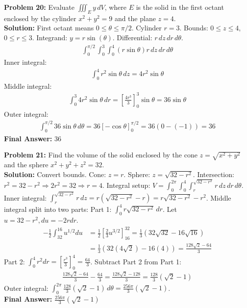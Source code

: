 \documentclass[12pt]{article}
\begin{document}
\textbf{Problem 20:} Evaluate $\iiint_E y \, dV$, where $E$ is the solid in the first octant enclosed by the cylinder $x^2+y^2=9$ and the plane $z=4$.
\\
\textbf{Solution:} First octant means $0 \le \theta \le \pi/2$. Cylinder $r=3$. Bounds: $0 \le z \le 4$, $0 \le r \le 3$. Integrand: $y = r\sin(\theta)$. Differential: $r \, dz \, dr \, d\theta$.
\begin{align*}
\int_0^{\pi/2} \int_0^3 \int_0^4 (r\sin\theta) r \, dz \, dr \, d\theta
\end{align*}
Inner integral:
\begin{align*}
\int_0^4 r^2\sin\theta \, dz = 4r^2\sin\theta
\end{align*}
Middle integral:
\begin{align*}
\int_0^3 4r^2\sin\theta \, dr = \left[ \frac{4r^3}{3} \right]_0^3 \sin\theta = 36\sin\theta
\end{align*}
Outer integral:
\begin{align*}
\int_0^{\pi/2} 36\sin\theta \, d\theta = 36[-\cos\theta]_0^{\pi/2} = 36(0 - (-1)) = 36
\end{align*}
\textbf{Final Answer:} $36$
\vspace{0.5cm}

\textbf{Problem 21:} Find the volume of the solid enclosed by the cone $z = \sqrt{x^2+y^2}$ and the sphere $x^2+y^2+z^2=32$.
\\
\textbf{Solution:} Convert bounds. Cone: $z=r$. Sphere: $z = \sqrt{32-r^2}$. Intersection: $r^2 = 32-r^2 \Rightarrow 2r^2=32 \Rightarrow r=4$.
Integral setup: $V = \int_0^{2\pi} \int_0^4 \int_r^{\sqrt{32-r^2}} r \, dz \, dr \, d\theta$.
Inner integral: $\int_r^{\sqrt{32-r^2}} r \, dz = r(\sqrt{32-r^2} - r) = r\sqrt{32-r^2} - r^2$.
Middle integral split into two parts:
Part 1: $\int_0^4 r\sqrt{32-r^2} \, dr$. Let $u=32-r^2, du=-2rdr$.
\begin{align*}
-\frac{1}{2} \int_{32}^{16} u^{1/2} du &= \frac{1}{2} \left[ \frac{2}{3}u^{3/2} \right]_{16}^{32} = \frac{1}{3}(32\sqrt{32} - 16\sqrt{16}) \\
&= \frac{1}{3}(32(4\sqrt{2}) - 16(4)) = \frac{128\sqrt{2} - 64}{3}
\end{align*}
Part 2: $\int_0^4 r^2 dr = \left[\frac{r^3}{3}\right]_0^4 = \frac{64}{3}$. Subtract Part 2 from Part 1:
\begin{align*}
\frac{128\sqrt{2} - 64}{3} - \frac{64}{3} = \frac{128\sqrt{2} - 128}{3} = \frac{128}{3}(\sqrt{2}-1)
\end{align*}
Outer integral: $\int_0^{2\pi} \frac{128}{3}(\sqrt{2}-1) \, d\theta = \frac{256\pi}{3}(\sqrt{2}-1)$.
\\
\textbf{Final Answer:} $\frac{256\pi}{3}(\sqrt{2}-1)$
\vspace{0.5cm}
\end{document}
